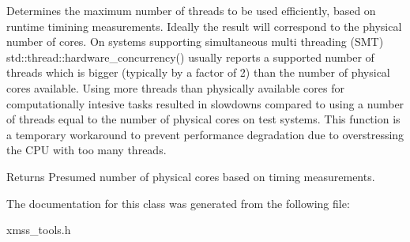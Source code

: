 Determines the maximum number of threads to be used efficiently, based on runtime timining measurements. Ideally the result will correspond to the physical number of cores. On systems supporting simultaneous multi threading (S\+MT) std\+::thread\+::hardware\+\_\+concurrency() usually reports a supported number of threads which is bigger (typically by a factor of 2) than the number of physical cores available. Using more threads than physically available cores for computationally intesive tasks resulted in slowdowns compared to using a number of threads equal to the number of physical cores on test systems. This function is a temporary workaround to prevent performance degradation due to overstressing the C\+PU with too many threads.

\begin{DoxyReturn}{Returns}
Presumed number of physical cores based on timing measurements. 
\end{DoxyReturn}


The documentation for this class was generated from the following file\+:\begin{DoxyCompactItemize}
\item 
xmss\+\_\+tools.\+h\end{DoxyCompactItemize}
